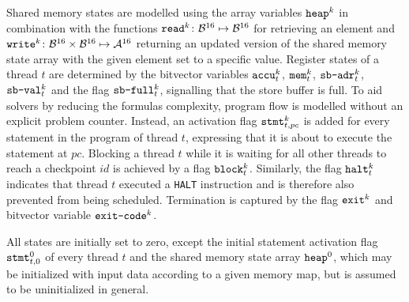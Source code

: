 Shared memory states are modelled using the array variables $\texttt{heap}^k$ in combination with the functions $\texttt{read}^k \colon \mathcal{B}^{16} \mapsto \mathcal{B}^{16}$ for retrieving an element and $\texttt{write}^k \colon \mathcal{B}^{16} \times \mathcal{B}^{16} \mapsto \mathcal{A}^{16}$ returning an updated version of the shared memory state array with the given element set to a specific value.
Register states of a thread $t$ are determined by the bitvector variables $\texttt{accu}^k_t$, $\texttt{mem}^k_t$, $\texttt{sb-adr}^k_t$, $\texttt{sb-val}^k_t$ and the flag $\texttt{sb-full}^k_t$, signalling that the store buffer is full.
To aid solvers by reducing the formulas complexity, program flow is modelled without an explicit problem counter.
Instead, an activation flag $\texttt{stmt}^k_{t, pc}$ is added for every statement in the program of thread $t$, expressing that it is about to execute the statement at $pc$.
Blocking a thread $t$ while it is waiting for all other threads to reach a checkpoint $id$ is achieved by a flag $\texttt{block}^k_t$.
Similarly, the flag $\texttt{halt}^k_t$ indicates that thread $t$ executed a \lstinline[language={[concubine]Assembler}]{HALT} instruction and is therefore also prevented from being scheduled.
Termination is captured by the flag $\texttt{exit}^k$ and bitvector variable $\texttt{exit-code}^k$.

All states are initially set to zero, except the initial statement activation flag $\texttt{stmt}^0_{t, 0}$ of every thread $t$ and the shared memory state array $\texttt{heap}^0$, which may be initialized with input data according to a given memory map, but is assumed to be uninitialized in general.

